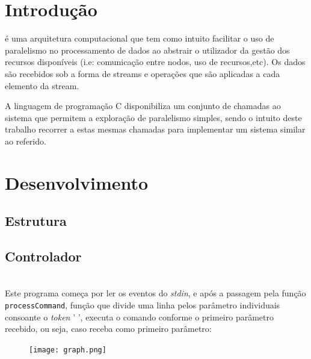 \documentclass[12pt]{article}
\begin{document}
\section{Introdução}
 é uma arquitetura computacional que tem como intuito facilitar o uso de paralelismo no processamento de dados ao abstrair o utilizador da gestão dos recursos disponíveis (i.e: comunicação entre nodos, uso de recursos,etc). Os dados são recebidos sob a forma de streams e operações que são aplicadas a cada elemento da stream. 

A linguagem de programação C disponibiliza um conjunto de chamadas ao sistema que permitem a exploração de paralelismo simples, sendo o intuito deste trabalho recorrer a estas mesmas chamadas para implementar um sistema similar ao referido.


\newpage


\section{Desenvolvimento} 

\subsection{Estrutura}

\subsection{Controlador}

\\Este programa começa por ler os eventos do \textit{stdin}, e após a passagem pela função \texttt{processCommand}, função que divide uma linha pelos parâmetro individuais consoante o \textit{token} ' ', executa o comando conforme o primeiro parâmetro recebido, ou seja, caso receba como primeiro parâmetro:

\begin{figure}[ht!]
    \centering
        \texttt{[image: graph.png]}
    \caption{}
\end{figure}
\end{document}
